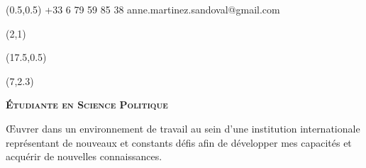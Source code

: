 \documentclass[30pt]{tccv}
\begin{document}
\begin{upshape}
\fontsize{10pt}{1.1em}\color{text}\selectfont



%
%




\begin{textblock}{6.5}(0.5,0.5)
    {+33 6 79 59 85 38}
    {anne.martinez.sandoval@gmail.com}
\end{textblock}

\begin{textblock}{21}(2,1)
\end{textblock}

\begin{textblock}{21}(17.5,0.5)
\end{textblock}  



\begin{textblock}{11}(7,2.3)
\begin{center}
\fontsize{10pt}{1.5em}\color{text}\bodyfontlight\upshape\selectfont

	{\fontsize{14pt}{5em}\scshape\bfseries \'Etudiante en Science Politique\\} 

	\vspace{5pt}
Œuvrer dans un environnement de travail au sein d’une institution internationale représentant de nouveaux et constants défis afin de développer mes capacités et acquérir de nouvelles connaissances. 
\end{center}
\end{textblock}  





%
%


\end{upshape}
\end{document}
